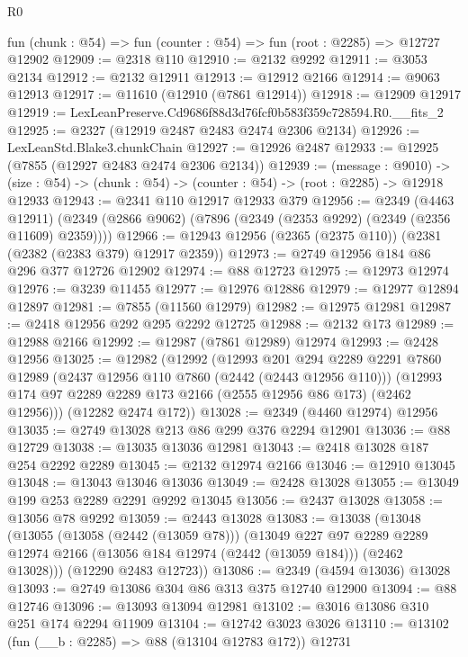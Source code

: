 \begin{lexlean}{R0}
\begin{coremodule}
  fun (chunk : @54) => fun (counter : @54) => fun (root : @2285) => @12727 @12902
@12909 := @2318 @110
@12910 := @2132 @9292
@12911 := @3053 @2134
@12912 := @2132 @12911
@12913 := @12912 @2166
@12914 := @9063 @12913
@12917 := @11610 (@12910 (@7861 @12914))
@12918 := @12909 @12917
@12919 := LexLeanPreserve.Cd9686f88d3d76fcf0b583f359c728594.R0.__fits_2
@12925 := @2327 (@12919 @2487 @2483 @2474 @2306 @2134)
@12926 := LexLeanStd.Blake3.chunkChain
@12927 := @12926 @2487
@12933 := @12925 (@7855 (@12927 @2483 @2474 @2306 @2134))
@12939 := (message : @9010) ->
  (size : @54) -> (chunk : @54) -> (counter : @54) -> (root : @2285) -> @12918 @12933
@12943 := @2341 @110 @12917 @12933 @379
@12956 := @2349
    (@4463 @12911)
    (@2349 (@2866 @9062) (@7896 (@2349 (@2353 @9292) (@2349 (@2356 @11609) @2359))))
@12966 := @12943 @12956 (@2365 (@2375 @110)) (@2381 (@2382 (@2383 @379) @12917 @2359))
@12973 := @2749 @12956 @184 @86 @296 @377 @12726 @12902
@12974 := @88 @12723
@12975 := @12973 @12974
@12976 := @3239 @11455
@12977 := @12976 @12886
@12979 := @12977 @12894 @12897
@12981 := @7855 (@11560 @12979)
@12982 := @12975 @12981
@12987 := @2418 @12956 @292 @295 @2292 @12725
@12988 := @2132 @173
@12989 := @12988 @2166
@12992 := @12987 (@7861 @12989) @12974
@12993 := @2428 @12956
@13025 := @12982
    (@12992
      (@12993
        @201
        @294
        @2289
        @2291
        @7860
        @12989
        (@2437 @12956 @110 @7860 (@2442 (@2443 @12956 @110)))
        (@12993 @174 @97 @2289 @2289 @173 @2166 (@2555 @12956 @86 @173) (@2462 @12956)))
      (@12282 @2474 @172))
@13028 := @2349 (@4460 @12974) @12956
@13035 := @2749 @13028 @213 @86 @299 @376 @2294 @12901
@13036 := @88 @12729
@13038 := @13035 @13036 @12981
@13043 := @2418 @13028 @187 @254 @2292 @2289
@13045 := @2132 @12974 @2166
@13046 := @12910 @13045
@13048 := @13043 @13046 @13036
@13049 := @2428 @13028
@13055 := @13049 @199 @253 @2289 @2291 @9292 @13045
@13056 := @2437 @13028
@13058 := @13056 @78 @9292
@13059 := @2443 @13028
@13083 := @13038
    (@13048
      (@13055
        (@13058 (@2442 (@13059 @78)))
        (@13049
          @227
          @97
          @2289
          @2289
          @12974
          @2166
          (@13056 @184 @12974 (@2442 (@13059 @184)))
          (@2462 @13028)))
      (@12290 @2483 @12723))
@13086 := @2349 (@4594 @13036) @13028
@13093 := @2749 @13086 @304 @86 @313 @375 @12740 @12900
@13094 := @88 @12746
@13096 := @13093 @13094 @12981
@13102 := @3016 @13086 @310 @251 @174 @2294 @11909
@13104 := @12742 @3023 @3026
@13110 := @13102 (fun (__b : @2285) => @88 (@13104 @12783 @172)) @12731

\end{coremodule}
\end{lexlean}
